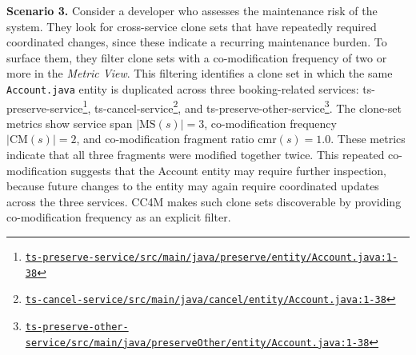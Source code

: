 \documentclass[conference]{IEEEtran}
\newcommand{\repo}{https://github.com/FudanSELab/train-ticket/blob/813dd01/}
\newcommand{\src}[2]{\href{\repo#1}{\nolinkurl{#2}}}
\begin{document}
\smallskip\noindent\textbf{Scenario 3.}
Consider a developer who assesses the maintenance risk of the system.
They look for cross-service clone sets that have repeatedly required
coordinated changes, since these indicate a recurring maintenance
burden.
To surface them, they filter clone sets with a co-modification frequency
of two or more in the \emph{Metric View}. This filtering identifies a clone set
in which the same \texttt{Account.java} entity is duplicated across
three booking-related services:
\mbox{ts-preserve-service}\footnote{\src{ts-preserve-service/src/main/java/preserve/entity/Account.java\#L1-L38}{ts-preserve-service/src/main/java/preserve/entity/Account.java:1-38}},
\mbox{ts-cancel-service}\footnote{\src{ts-cancel-service/src/main/java/cancel/entity/Account.java\#L1-L38}{ts-cancel-service/src/main/java/cancel/entity/Account.java:1-38}},
and
\mbox{ts-preserve-other-service}\footnote{\src{ts-preserve-other-service/src/main/java/preserveOther/entity/Account.java\#L1-L38}{ts-preserve-other-service/src/main/java/preserveOther/entity/Account.java:1-38}}.
The clone-set metrics show service span $|\mathrm{MS}(s)| = 3$,
co-modification frequency $|\mathrm{CM}(s)| = 2$, and
co-modification fragment ratio $\mathrm{cmr}(s) = 1.0$. These metrics
indicate that all three fragments were modified together twice.
This repeated co-modification suggests that the Account entity may
require further inspection, because future changes to the entity may
again require coordinated updates across the three services. \textsc{CC4M}
makes such clone sets discoverable by providing co-modification
frequency as an explicit filter.



\end{document}
